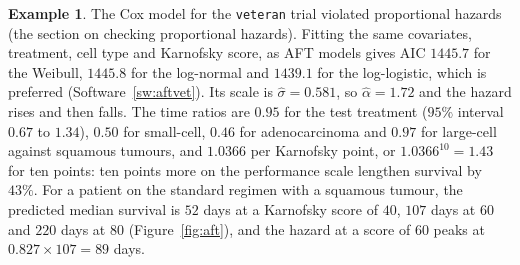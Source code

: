\documentclass[11pt,a4paper]{article}
\numberwithin{equation}{section}
\theoremstyle{definition}
\newtheorem{exa}[thm]{Example}
\begin{document}
\begin{exa}
\label{ex:vetaft}
The Cox model for the \texttt{veteran} trial violated proportional hazards (the section on checking proportional hazards). Fitting the same covariates, treatment, cell type and Karnofsky score, as AFT models gives AIC $1445.7$ for the Weibull, $1445.8$ for the log-normal and $1439.1$ for the log-logistic, which is preferred (Software~\ref{sw:aftvet}). Its scale is
$\hat\sigma = 0.581$, so $\hat\alpha = 1.72$ and the hazard rises and then falls. The time ratios are $0.95$ for the test treatment ($95\%$ interval $0.67$ to $1.34$), $0.50$ for small-cell, $0.46$ for adenocarcinoma and $0.97$ for large-cell against squamous tumours, and $1.0366$ per Karnofsky point, or $1.0366^{10} = 1.43$ for ten points: ten points more on the performance scale lengthen survival by $43\%$. For a patient on the standard regimen with a squamous tumour,
the predicted median survival is $52$ days at a Karnofsky score of $40$, $107$ days at $60$ and $220$ days at $80$ (Figure~\ref{fig:aft}), and the hazard at a score of $60$ peaks at $0.827 \times 107 = 89$ days.
\end{exa}
\end{document}
